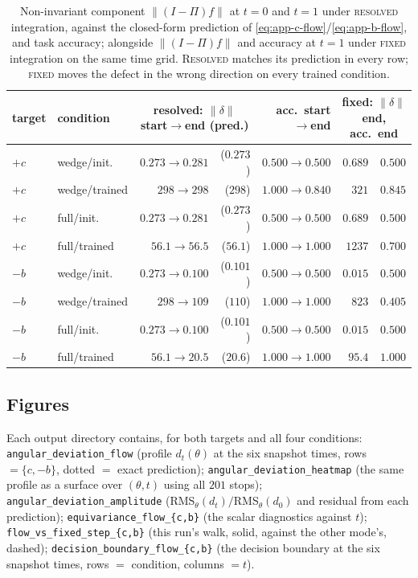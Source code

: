 \begin{table}[h]
\centering
\small
\begin{tabular}{llrrrrr}
\toprule
target & condition & \multicolumn{2}{c}{resolved: $\lVert\delta\rVert$ start$\to$end (pred.)} & acc.\ start$\to$end & \multicolumn{2}{c}{fixed: $\lVert\delta\rVert$ end, acc.\ end} \\
\midrule
$+c$ & wedge/init.\  & $0.273\to0.281$ & ($0.273$) & $0.500\to0.500$ & $0.689$ & $0.500$ \\
$+c$ & wedge/trained & $298\to298$     & ($298$)   & $1.000\to0.840$ & $321$   & $0.845$ \\
$+c$ & full/init.\   & $0.273\to0.281$ & ($0.273$) & $0.500\to0.500$ & $0.689$ & $0.500$ \\
$+c$ & full/trained  & $56.1\to56.5$   & ($56.1$)  & $1.000\to1.000$ & $1237$  & $0.700$ \\
$-b$ & wedge/init.\  & $0.273\to0.100$ & ($0.101$) & $0.500\to0.500$ & $0.015$ & $0.500$ \\
$-b$ & wedge/trained & $298\to109$     & ($110$)   & $1.000\to1.000$ & $823$   & $0.405$ \\
$-b$ & full/init.\   & $0.273\to0.100$ & ($0.101$) & $0.500\to0.500$ & $0.015$ & $0.500$ \\
$-b$ & full/trained  & $56.1\to20.5$   & ($20.6$)  & $1.000\to1.000$ & $95.4$  & $1.000$ \\
\bottomrule
\end{tabular}
\caption{Non-invariant component $\lVert(I-\Pi)f\rVert$ at $t=0$ and $t=1$
under \textsc{resolved} integration, against the closed-form prediction of
\eqref{eq:app-c-flow}/\eqref{eq:app-b-flow}, and task accuracy;
alongside $\lVert(I-\Pi)f\rVert$ and accuracy at $t=1$ under \textsc{fixed}
integration on the same time grid. \textsc{Resolved} matches its prediction
in every row; \textsc{fixed} moves the defect in the wrong direction on every
trained condition.}
\label{tab:equivariance-flow-results}
\end{table}

\subsection{Figures}

Each output directory contains, for both targets and all four conditions:
\texttt{angular\_deviation\_flow} (profile $d_t(\theta)$ at the six snapshot
times, rows $=\{c,-b\}$, dotted $=$ exact prediction);
\texttt{angular\_deviation\_heatmap} (the same profile as a surface over
$(\theta,t)$ using all $201$ stops); \texttt{angular\_deviation\_amplitude}
(RMS$_\theta(d_t)/$RMS$_\theta(d_0)$ and residual from each prediction);
\texttt{equivariance\_flow\_\{c,b\}} (the scalar diagnostics against $t$);
\texttt{flow\_vs\_fixed\_step\_\{c,b\}} (this run's walk, solid, against the
other mode's, dashed); \texttt{decision\_boundary\_flow\_\{c,b\}} (the
decision boundary at the six snapshot times, rows $=$ condition, columns
$=t$).

